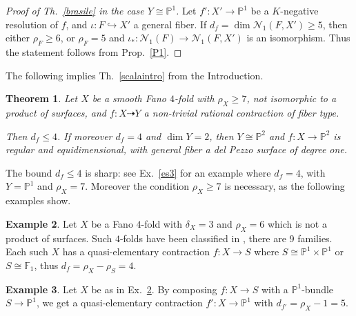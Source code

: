 \documentclass[a4paper,12pt]{amsart}
\newtheorem{thm}{Theorem}[section]
\theoremstyle{definition}
\newtheorem{example}[thm]{Example}
\numberwithin{figure}{section}
\numberwithin{table}{section}
\newcommand{\pr}{\mathbb{P}}
\newcommand{\N}{\mathcal{N}_1}
\begin{document}
\begin{proof}[Proof of Th.~\ref{brasile} in the case $Y\cong\pr^1$]
Let $f'\colon X'\to\pr^1$ be a $K$-negative resolution of $f$, and $\iota\colon F\hookrightarrow X'$ a general fiber.
 If $d_f=\dim\N(F,X')\geq 5$, then either $\rho_F\geq 6$, or $\rho_F=5$ and $\iota_*\colon\N(F)\to\N(F,X')$ is an isomorphism. Thus the statement follows from Prop.~\ref{P1}.
\end{proof}
The following implies Th.~\ref{scalaintro} from the Introduction.
\begin{thm}\label{scala}
  Let $X$ be a smooth Fano $4$-fold with $\rho_X\geq 7$, not isomorphic to a product of surfaces, and $f\colon X\dasharrow Y$ a non-trivial rational contraction of fiber type.

  Then $d_f\leq 4$. If moreover $d_f= 4$ and $\dim Y=2$, then  $Y\cong\pr^2$ and $f\colon X\to\pr^2$ is regular and equidimensional, with general fiber a del Pezzo surface of degree one.
\end{thm}
The bound $d_f\leq 4$ is sharp: see
Ex.~\ref{es3} for an example where $d_f=4$, with $Y=\pr^1$ and $\rho_X=7$.
 Moreover the condition $\rho_X\geq 7$ is necessary, as the following examples show.
\begin{example}\label{es1}
  Let $X$ be a Fano $4$-fold with $\delta_X=3$ and $\rho_X=6$ which is not a product of surfaces. Such $4$-folds have been classified in \cite[\S 7 and Corrigendum]{delta3}, there are 9 families. Each such $X$ has a quasi-elementary contraction $f\colon X\to S$ where $S\cong \pr^1\times\pr^1$ or $S\cong\mathbb{F}_1$, thus $d_f=\rho_X-\rho_S=4$.
\end{example}
\begin{example}\label{es2}
  Let $X$ be  as in Ex.~\ref{es1}.
  By composing $f\colon X\to S$ with a $\pr^1$-bundle $S\to\pr^1$, we get a quasi-elementary contraction $f'\colon X\to\pr^1$ with $d_{f'}=\rho_X-1=5$.
\end{example}  
\end{document}
